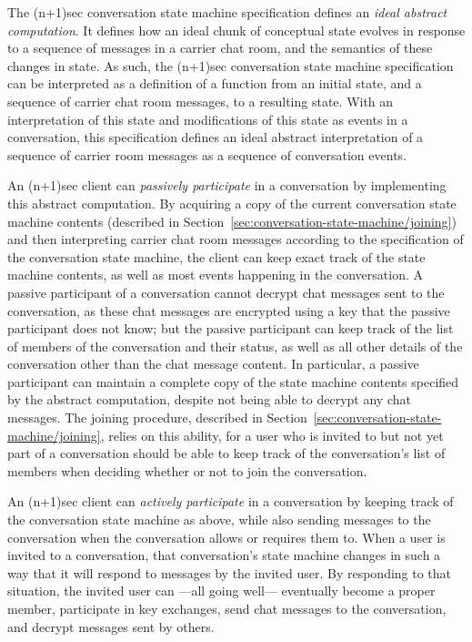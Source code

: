 \documentclass{article}
\begin{document}
The (n+1)sec conversation state machine specification defines an \emph{ideal abstract computation}.
It defines how an ideal chunk of conceptual state evolves in response to a sequence of messages in a carrier chat room, and the semantics of these changes in state.
As such, the (n+1)sec conversation state machine specification can be interpreted as a definition of a function from an initial state, and a sequence of carrier chat room messages, to a resulting state.
With an interpretation of this state and modifications of this state as events in a conversation, this specification defines an ideal abstract interpretation of a sequence of carrier room messages as a sequence of conversation events.

An (n+1)sec client can \emph{passively participate} in a conversation by implementing this abstract computation.
By acquiring a copy of the current conversation state machine contents (described in Section~\ref{sec:conversation-state-machine/joining}) and then interpreting carrier chat room messages according to the specification of the conversation state machine, the client can keep exact track of the state machine contents, as well as most events happening in the conversation.
A passive participant of a conversation cannot decrypt chat messages sent to the conversation, as these chat messages are encrypted using a key that the passive participant does not know; but the passive participant can keep track of the list of members of the conversation and their status, as well as all other details of the conversation other than the chat message content.
In particular, a passive participant can maintain a complete copy of the state machine contents specified by the abstract computation, despite not being able to decrypt any chat messages.
The joining procedure, described in Section~\ref{sec:conversation-state-machine/joining}, relies on this ability, for a user who is invited to but not yet part of a conversation should be able to keep track of the conversation's list of members when deciding whether or not to join the conversation.

An (n+1)sec client can \emph{actively participate} in a conversation by keeping track of the conversation state machine as above, while also sending messages to the conversation when the conversation allows or requires them to.
When a user is invited to a conversation, that conversation's state machine changes in such a way that it will respond to messages by the invited user.
By responding to that situation, the invited user can ---all going well--- eventually become a proper member, participate in key exchanges, send chat messages to the conversation, and decrypt messages sent by others.
\end{document}
